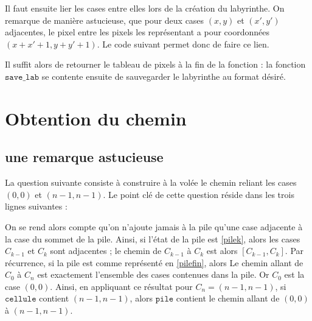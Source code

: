 \documentclass[11pt,a4paper]{article}
\begin{document}


Il faut ensuite lier les cases entre elles lors de la création du labyrinthe. On remarque de manière astucieuse, que pour deux cases $(x,y)$ et $(x',y')$ adjacentes, le pixel entre les pixels les représentant a pour coordonnées $(x+x'+1,y+y'+1)$. Le code suivant permet donc de faire ce lien.



Il suffit alors de retourner le tableau de pixels à la fin de la fonction : la fonction $\mathtt{save\_lab}$ se contente ensuite de sauvegarder le labyrinthe au format désiré.




\section{Obtention du chemin}

\subsection{une remarque astucieuse}
La question suivante consiste à construire à la volée le chemin reliant les cases $(0,0)$ et $(n-1,n-1)$.  Le point clé de cette question réside dans les trois lignes suivantes :

On se rend alors compte qu'on n'ajoute jamais à la pile qu'une case adjacente à la case du sommet de la pile. Ainsi, si l'état de la pile est \ref{pilek}, alors les cases $C_{k-1}$ et $C_{k}$ sont adjacentes ; le chemin de $C_{k-1}$ à $C_{k}$ est alors $[C_{k-1},C_{k}]$. Par récurrence, si la pile est comme représenté en \ref{pilefin}, alors Le chemin allant de $C_0$ à $C_n$ est exactement l'ensemble des cases contenues dans la pile. Or $C_0$ est la case $(0,0)$. Ainsi, en appliquant ce résultat pour $C_n = (n-1,n-1)$, si $\mathtt{cellule}$ contient $(n-1,n-1)$, alors $\mathtt{pile}$ contient le chemin allant de $(0,0)$ à $(n-1,n-1)$.
\end{document}
